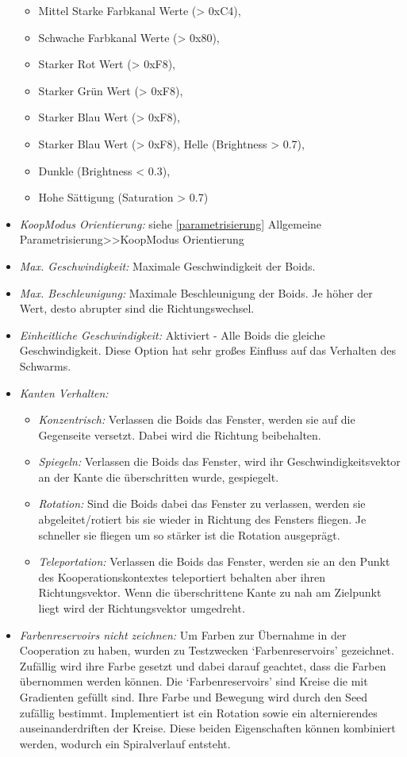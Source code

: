 \documentclass[../mciAusarbeitung.tex]{subfiles}
\begin{document}
\begin{itemize}
\begin{itemize}
			\item Mittel Starke Farbkanal Werte (> 0xC4),
			\item Schwache Farbkanal Werte (> 0x80),
			\item Starker Rot Wert (> 0xF8),
			\item Starker Grün Wert (> 0xF8),
			\item Starker Blau Wert (> 0xF8),
			\item Starker Blau Wert (> 0xF8), Helle (Brightness > 0.7),
			\item Dunkle (Brightness < 0.3),
			\item Hohe Sättigung (Saturation > 0.7)
		\end{itemize}
	\item\textit{KoopModus Orientierung:}  siehe \ref{parametrisierung} Allgemeine Parametrisierung>>KoopModus Orientierung
	\item\textit{Max. Geschwindigkeit:} Maximale Geschwindigkeit der Boids.
	\item\textit{Max. Beschleunigung:} Maximale Beschleunigung der Boids. Je höher der Wert, desto abrupter sind die Richtungswechsel.
	\item\textit{Einheitliche Geschwindigkeit:} Aktiviert - Alle Boids die gleiche Geschwindigkeit. Diese Option hat sehr großes Einfluss auf das Verhalten des Schwarms.
	\item\textit{Kanten Verhalten:}
		\begin{itemize}
		\setlength\itemsep{-0.1em}
			\item\textit{Konzentrisch:} Verlassen die Boids das Fenster, werden sie auf die Gegenseite versetzt. Dabei wird die Richtung beibehalten.
			\item\textit{Spiegeln:} Verlassen die Boids das Fenster, wird ihr Geschwindigkeitsvektor an der Kante die überschritten wurde, gespiegelt.
			\item\textit{Rotation:} Sind die Boids dabei das Fenster zu verlassen, werden sie abgeleitet/rotiert bis sie wieder in Richtung des Fensters fliegen. Je schneller sie fliegen um so stärker ist die Rotation ausgeprägt.
			\item\textit{Teleportation:} Verlassen die Boids das Fenster, werden sie an den Punkt des Kooperationskontextes teleportiert behalten aber ihren Richtungsvektor. Wenn die überschrittene Kante zu nah am Zielpunkt liegt wird der Richtungsvektor umgedreht.
		\end{itemize}	
	\item\textit{Farbenreservoirs nicht zeichnen:} Um Farben zur Übernahme in der Cooperation zu haben, wurden zu Testzwecken `Farbenreservoirs' gezeichnet. Zufällig wird ihre Farbe gesetzt und dabei darauf geachtet, dass die Farben übernommen werden können. Die `Farbenreservoirs'  sind Kreise die mit Gradienten gefüllt sind. Ihre Farbe und Bewegung wird durch den Seed zufällig bestimmt. Implementiert ist ein Rotation sowie ein alternierendes auseinanderdriften der Kreise. Diese beiden Eigenschaften können kombiniert werden, wodurch ein Spiralverlauf entsteht.

\end{itemize}
\end{document}
